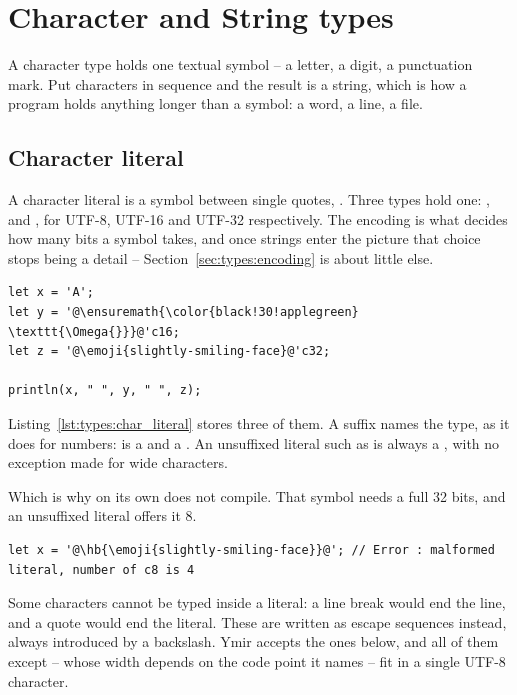 \vfill\pagebreak
\section{Character and String types}
\label{sec:types:chars_strings}

A character type holds one textual symbol -- a letter, a digit, a punctuation
mark. Put characters in sequence and the result is a string, which is how a
program holds anything longer than a symbol: a word, a line, a file.

\subsection{Character literal}
\label{sec:types:char_literal}

A character literal is a symbol between single quotes, . Three types
hold one: ,  and , for UTF-8, UTF-16 and UTF-32
respectively. The encoding is what decides how many bits a symbol takes, and once
strings enter the picture that choice stops being a detail --
Section~\ref{sec:types:encoding} is about little else.

\begin{lstlisting}[style=coloredverbatim, label=lst:types:char_literal, caption=Example of character literals, escapechar=@]
let x = 'A';
let y = '@\ensuremath{\color{black!30!applegreen} \texttt{\Omega{}}}@'c16;
let z = '@\emoji{slightly-smiling-face}@'c32;

println(x, " ", y, " ", z);
\end{lstlisting}


Listing~\ref{lst:types:char_literal} stores three of them. A suffix names the
type, as it does for numbers:  is a  and
 a . An unsuffixed literal such as  is
always a , with no exception made for wide characters.

Which is why  on its own does not compile. That symbol needs a full
32 bits, and an unsuffixed literal offers it 8.

\begin{lstlisting}[style=coloredverbatimError, label=lst:types:char_encode_error, escapechar=@]
let x = '@\hb{\emoji{slightly-smiling-face}}@'; // Error : malformed literal, number of c8 is 4 
\end{lstlisting}%

Some characters cannot be typed inside a literal: a line break would end the
line, and a quote would end the literal. These are written as escape sequences
instead, always introduced by a backslash. Ymir accepts the ones below, and all
of them except  -- whose width depends on
the code point it names -- fit in a single UTF-8 character.

